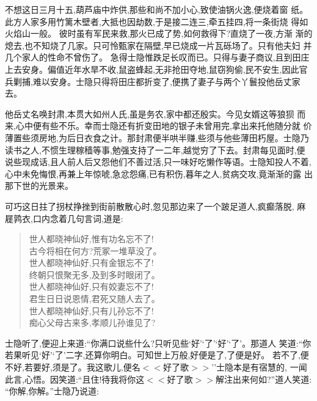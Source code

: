 \documentclass[nofonts]{ctexbook}
\newcommand*{\wei}{\CJKfamily{xinwei}}    %
\begin{document}
    不想这日三月十五,葫芦庙中炸供,那些和尚不加小心,致使油锅火逸,便烧着窗
纸。 此方人家多用竹篱木壁者,大抵也因劫数,于是接二连三,牵五挂四,将一条街烧
得如火焰山一般。 彼时虽有军民来救,那火已成了势,如何救得下?直烧了一夜,方渐
渐的熄去,也不知烧了几家。只可怜甄家在隔壁,早已烧成一片瓦砾场了。只有他夫妇
并几个家人的性命不曾伤了。 急得士隐惟跌足长叹而已。只得与妻子商议,且到田庄
上去安身。偏值近年水旱不收,鼠盗蜂起,无非抢田夺地,鼠窃狗偷,民不安生,因此官
兵剿捕,难以安身。士隐只得将田庄都折变了,便携了妻子与两个丫鬟投他岳丈家去。

    他岳丈名唤封肃,本贯大如州人氏,虽是务农,家中都还殷实。今见女婿这等狼狈
而来,心中便有些不乐。幸而士隐还有折变田地的银子未曾用完,拿出来托他随分就
价薄置些须房地,为后日衣食之计。那封肃便半哄半赚,些须与他些薄田朽屋。士隐乃
读书之人,不惯生理稼穑等事,勉强支持了一二年,越觉穷了下去。封肃每见面时,便
说些现成话,且人前人后又怨他们不善过活,只一味好吃懒作等语。士隐知投人不着,
心中未免悔恨,再兼上年惊唬,急忿怨痛,已有积伤,暮年之人,贫病交攻,竟渐渐的露
出那下世的光景来。

    可巧这日拄了拐杖挣挫到街前散散心时,忽见那边来了一个跛足道人,疯癫落脱,
麻屣鹑衣,口内念着几句言词,道是:

\begin{verse} \wei
    世人都晓神仙好,惟有功名忘不了!\\
    古今将相在何方?荒冢一堆草没了。\\
    世人都晓神仙好,只有金银忘不了!\\
    终朝只恨聚无多,及到多时眼闭了。\\
    世人都晓神仙好,只有姣妻忘不了!\\
    君生日日说恩情,君死又随人去了。\\
    世人都晓神仙好,只有儿孙忘不了!\\
    痴心父母古来多,孝顺儿孙谁见了?
\end{verse}

    士隐听了,便迎上来道:``你满口说些什么?只听见些`好'`了'`好'`了'。那道人
笑道:``你若果听见`好'`了'二字,还算你明白。可知世上万般,好便是了,了便是好。
若不了,便不好,若要好,须是了。我这歌儿,便名$<<$好了歌$>>$''士隐本是有宿慧的,
一闻此言,心悟。因笑道:``且住!待我将你这$<<$好了歌$>>$解注出来何如?''道人笑道:
``你解,你解。''士隐乃说道:
\end{document}
